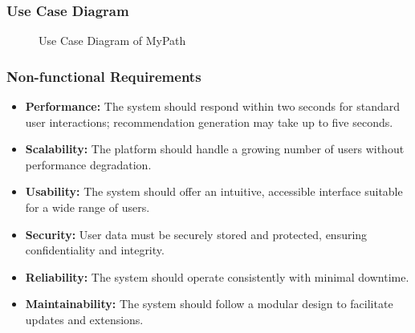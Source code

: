 \documentclass[12pt,a4paper]{article}
\begin{document}
\subsubsection*{Use Case Diagram}

\begin{figure}[H]
  \centering
  \caption{Use Case Diagram of MyPath}
\end{figure}

\subsubsection{Non-functional Requirements}

\begin{itemize}
  \item \textbf{Performance:} The system should respond within two seconds for standard user interactions; recommendation generation may take up to five seconds.
  \item \textbf{Scalability:} The platform should handle a growing number of users without performance degradation.
  \item \textbf{Usability:} The system should offer an intuitive, accessible interface suitable for a wide range of users.
  \item \textbf{Security:} User data must be securely stored and protected, ensuring confidentiality and integrity.
  \item \textbf{Reliability:} The system should operate consistently with minimal downtime.
  \item \textbf{Maintainability:} The system should follow a modular design to facilitate updates and extensions.
\end{itemize}
\end{document}
